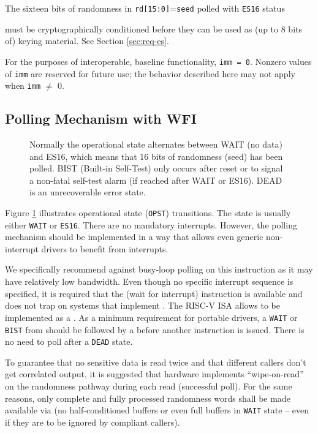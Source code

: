    The sixteen bits of randomness in \verb|rd[15:0]|=\verb|seed| polled
    with \verb|ES16| status {must be cryptographically conditioned
    before they can be used as (up to 8 bits of) keying material.
    See Section \ref{sec:req-es}.

    For the purposes of interoperable, baseline functionality, \verb|imm = 0|.
    Nonzero values of \verb|imm| are reserved for future use; the behavior
    described here may not apply when \verb|imm| $\neq$ 0.


\subsection{Polling Mechanism with WFI}
\label{sec:es-polling}

\begin{figure}[tb]
    \centering
    
    \caption{Normally the operational state alternates between WAIT
        (no data) and ES16, which means that 16 bits of randomness (seed)
        has been polled. BIST (Built-in Self-Test) only occurs after reset
        or to signal a non-fatal self-test alarm (if reached after WAIT or
        ES16). DEAD is an unrecoverable error state.}
    \label{fig:esstate_tikz}
\end{figure}

    Figure \ref{fig:esstate_tikz} illustrates operational state
    (\verb|OPST|) transitions. The state is usually either \verb|WAIT| or
    \verb|ES16|. There are no mandatory interrupts. However, the polling
    mechanism should be implemented in a way that allows even generic
    non-interrupt drivers to benefit from interrupts.

    We specifically recommend against busy-loop polling on this instruction
    as it may have relatively low bandwidth. Even though no specific interrupt
    sequence is specified, it is required that the  (wait for
    interrupt) instruction is available and does not trap on systems that
    implement . The RISC-V ISA allows  to be
    implemented as a .
    As a minimum requirement for portable drivers, a \verb|WAIT| or
    \verb|BIST| from  should be followed by a 
     before another  instruction is 
    issued. There is no need to poll after a \verb|DEAD| state.

    To guarantee that no sensitive data is read twice and that different
    callers don't get correlated output, it is suggested that hardware
    implements ``wipe-on-read'' on the randomness
    pathway during each read (successful poll). For the same reasons, only complete
    and fully processed randomness words shall be made available via
     (no half-conditioned buffers or even full buffers
    in \verb|WAIT| state -- even if they are to be ignored by compliant
    callers).

}
